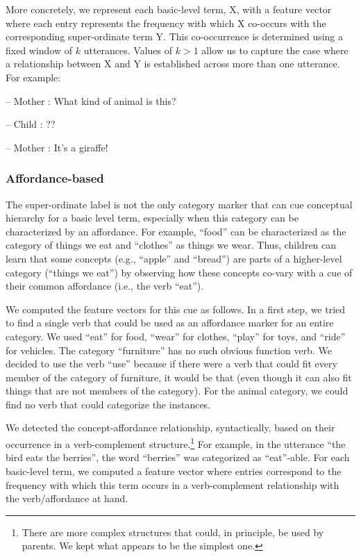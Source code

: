 \documentclass[10pt, letterpaper]{article}
\begin{document}
More concretely, we represent each basic-level term, X, with a feature
vector where each entry represents the frequency with which X co-occurs
with the corresponding super-ordinate term Y. This co-occurrence is
determined using a fixed window of \(k\) utterances. Values of \(k > 1\)
allow us to capture the case where a relationship between X and Y is
established across more than one utterance. For example:

-- Mother : What kind of animal is this?

-- Child : ??

-- Mother : It's a giraffe!

\hypertarget{affordance-based}{%
\subsubsection{Affordance-based}\label{affordance-based}}

The super-ordinate label is not the only category marker that can cue
conceptual hierarchy for a basic level term, especially when this
category can be characterized by an affordance. For example, ``food''
can be characterized as the category of things we eat and ``clothes'' as
things we wear. Thus, children can learn that some concepts (e.g.,
``apple'' and ``bread'') are parts of a higher-level category (``things
we eat'') by observing how these concepts co-vary with a cue of their
common affordance (i.e., the verb ``eat'').

We computed the feature vectors for this cue as follows. In a first
step, we tried to find a single verb that could be used as an affordance
marker for an entire category. We used ``eat'' for food, ``wear'' for
clothes, ``play'' for toys, and ``ride'' for vehicles. The category
``furniture'' has no such obvious function verb. We decided to use the
verb ``use'' because if there were a verb that could fit every member of
the category of furniture, it would be that (even though it can also fit
things that are not members of the category). For the animal category,
we could find no verb that could categorize the instances.

We detected the concept-affordance relationship, syntactically, based on
their occurrence in a verb-complement
structure.\footnote{There are more complex structures that could, in principle, be used by parents. We kept what appears to be the simplest one.}
For example, in the utterance ``the bird eats the berries'', the word
``berries'' was categorized as ``eat''-able. For each basic-level term,
we computed a feature vector where entries correspond to the frequency
with which this term occurs in a verb-complement relationship with the
verb/affordance at hand.
\end{document}
